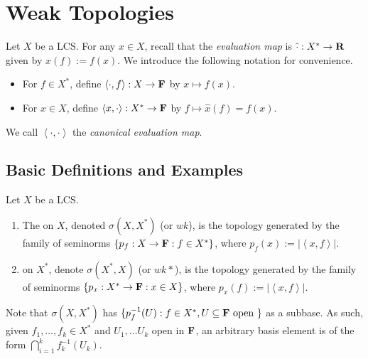 \chapter{Weak Topologies}
\vspace{-25pt}
Let $X$ be a LCS. For any $x \in X$, recall that the \textit{evaluation map} is $\hat{\cdot}:X^\ast \rightarrow \mathbf{R}$ given by $\hat{x}(f) := f(x)$. We introduce the following notation for convenience.
\mbox{}
\begin{itemize}[itemsep=1pt,topsep=3pt]
	\item For $f \in X^\ast$, define $\left<\cdot, f \right>:X \rightarrow \mathbf{F}$ by $x \mapsto f(x)$.
	\item For $x \in X$, define $\left<x,\cdot \right>:X^\ast \rightarrow \mathbf{F}$ by $f \mapsto \hat{x}(f) = f(x)$.
\end{itemize}
We call $\left<\cdot,\cdot \right>$ the \textit{canonical evaluation map}.

\section{Basic Definitions and Examples}

\begin{definition}
	Let $X$ be a LCS.
	\mbox{}
	\begin{enumerate}[label = (\alph*),itemsep=1pt,topsep=3pt]
		\item The  on $X$, denoted $\sigma (X,X^\ast)$ (or $wk$), is the topology generated by the family of seminorms $\{p_f:X \rightarrow \mathbf{F} : f \in X^\ast\}$, where $p_f(x) := |\left<x,f \right>|$.
		\item {} on $X^\ast$, denote $\sigma(X^\ast,X)$ (or $wk*$), is the topology generated by the family of seminorms $\{p_x:X^\ast \rightarrow \mathbf{F} :x \in X\}$, where $p_x(f) := |\left<x,f \right>|$.
	\end{enumerate}
\end{definition}

\begin{remark}
	Note that $\sigma(X,X^\ast)$ has $\{p_f^{-1}(U) : f \in X^\ast, U \subseteq \mathbf{F} \text{ open }\}$ as a subbase. As such, given $f_1,\ldots ,f_k \in X^\ast$ and $U_1,\ldots U_k$ open in $\mathbf{F}$, an arbitrary basis element is of the form $\bigcap_{i = 1}^k f_k^{-1}(U_k)$.
\end{remark}




